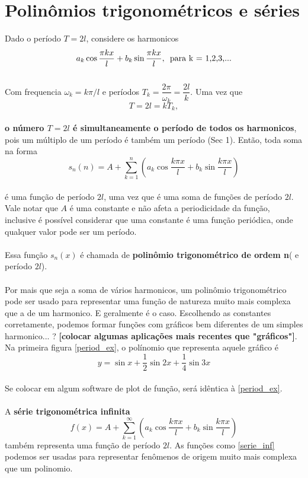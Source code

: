 \section{Polinômios trigonométricos e séries}
Dado o período $T=2l$, considere os harmonicos\\
\begin{equation}
    a_k\cos{\dfrac{\pi kx}{l}} + b_k\sin{\dfrac{\pi kx}{l}},\text{\hspace{5pt}para k = 1,2,3,...}
\end{equation}
\\
Com frequencia $\omega_k = k\pi/l$ e períodos $T_k = \dfrac{2\pi}{\omega_k} = \dfrac{2l}{k}$. 
Uma vez que 
\begin{equation}
    T = 2l = kT_k,
\end{equation}  
\\
\textbf{o número $T=2l$ é simultaneamente o período de todos os harmonicos},
pois um múltiplo de um período é também um período (Sec 1). Então, toda soma na 
forma\\
\begin{equation}
    s_n(n) = A + \sum\limits_{k=1}^{n}(a_k\cos{\dfrac{k\pi x}{l} + b_k\sin{\dfrac{k\pi x}{l}}})
\end{equation}
\\
é uma função de período $2l$, uma vez que é uma soma de funções de período 
$2l$. Vale notar que $A$ é uma constante e não afeta a periodicidade da função,
inclusive é possível considerar que uma constante é uma função periódica, onde 
qualquer valor pode ser um período.\\
\\
Essa função $s_n(x)$ é chamada  de \textbf{polinômio trigonométrico de ordem n}(
e período $2l$).\\
\\
Por mais que seja a soma de vários harmonicos, um polinômio trigonométrico pode 
ser usado para representar uma função de natureza muito mais complexa que a 
de um harmonico. E geralmente é o caso. Escolhendo as constantes corretamente,
podemos formar funções com gráficos bem diferentes de um simples harmonico... ?
\textbf{[colocar algumas aplicações mais recentes que "gráficos"]}.
\\
Na primeira figura \ref{period_ex}, o polínomio que representa aquele gráfico é\\
\begin{equation}
    y = \sin{x} + \dfrac{1}{2}\sin{2x} + \dfrac{1}{4}\sin{3x}
\end{equation}
\\
Se colocar em algum software de plot de função, será idêntica à \ref{period_ex}.\\
\\
A \textbf{série trigonométrica infinita}\\ 
\begin{equation}
\label{serie_inf}
    f(x) = A + \sum\limits_{k=1}^{\infty}(a_k\cos{\dfrac{k\pi x}{l}} + b_k\sin{\dfrac{k\pi x}{l}})
\end{equation}
também representa uma função de período $2l$. As funções como \ref{serie_inf} podemos
ser usadas para representar fenômenos de origem muito mais complexa que um polinomio.

